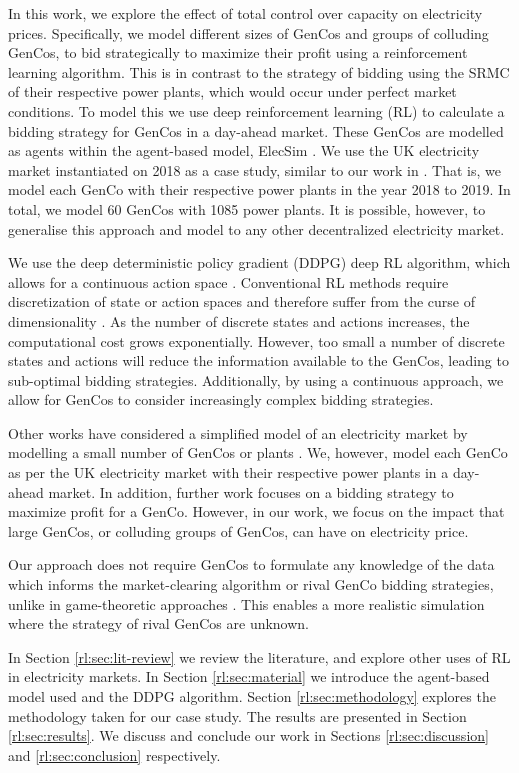 In this work, we explore the effect of total control over capacity on electricity prices. Specifically, we model different sizes of GenCos and groups of colluding GenCos, to bid strategically to maximize their profit using a reinforcement learning algorithm. This is in contrast to the strategy of bidding using the SRMC of their respective power plants, which would occur under perfect market conditions. To model this we use deep reinforcement learning (RL) to calculate a bidding strategy for GenCos in a day-ahead market. These GenCos are modelled as agents within the agent-based model, ElecSim \cite{Kell, Kell2020}. We use the UK electricity market instantiated on 2018 as a case study, similar to our work in \cite{Kell2019a}. That is, we model each GenCo with their respective power plants in the year 2018 to 2019. In total, we model 60 GenCos with 1085 power plants. It is possible, however, to generalise this approach and model to any other decentralized electricity market. 

We use the deep deterministic policy gradient (DDPG) deep RL algorithm, which allows for a continuous action space \cite{Hunt2016a}. Conventional RL methods require discretization of state or action spaces and therefore suffer from the curse of dimensionality \cite{Ye2020a}. As the number of discrete states and actions increases, the computational cost grows exponentially. However, too small a number of discrete states and actions will reduce the information available to the GenCos, leading to sub-optimal bidding strategies. Additionally, by using a continuous approach, we allow for GenCos to consider increasingly complex bidding strategies. 

Other works have considered a simplified model of an electricity market by modelling a small number of GenCos or plants \cite{EsmaeiliAliabadi2017,Tellidou2007}. We, however, model each GenCo as per the UK electricity market with their respective power plants in a day-ahead market. In addition, further work focuses on a bidding strategy to maximize profit for a GenCo. However, in our work, we focus on the impact that large GenCos, or colluding groups of GenCos, can have on electricity price.


Our approach does not require GenCos to formulate any knowledge of the data which informs the market-clearing algorithm or rival GenCo bidding strategies, unlike in game-theoretic approaches \cite{Wang2011}. This enables a more realistic simulation where the strategy of rival GenCos are unknown.

In Section \ref{rl:sec:lit-review} we review the literature, and explore other uses of RL in electricity markets. In Section \ref{rl:sec:material} we introduce the agent-based model used and the DDPG algorithm. Section \ref{rl:sec:methodology} explores the methodology taken for our case study. The results are presented in Section \ref{rl:sec:results}. We discuss and conclude our work in Sections \ref{rl:sec:discussion} and \ref{rl:sec:conclusion} respectively. 




